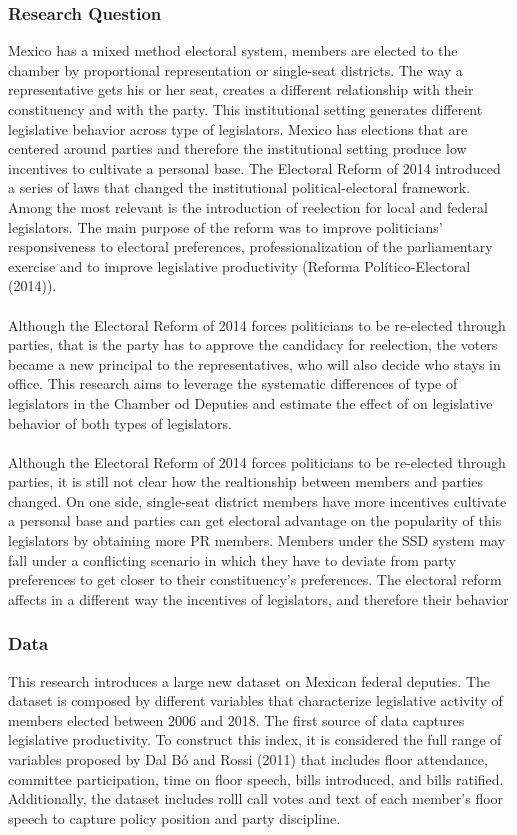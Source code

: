 \documentclass{article}
\begin{document}
\subsubsection*{Research Question}
 Mexico has a mixed method electoral system, members are elected to the chamber by proportional representation or single-seat districts. The way a representative gets his or her seat, creates a different relationship with their constituency and  with the party. This institutional setting generates different legislative behavior across type of legislators. Mexico has elections that are centered around parties and therefore the institutional setting produce low incentives to cultivate a personal base. The Electoral Reform of 2014 introduced a series of laws that changed the institutional political-electoral framework. Among the most relevant is the introduction of reelection for local and federal legislators. The main purpose of the reform was to improve politicians’ responsiveness to electoral preferences, professionalization of the parliamentary exercise and to improve legislative productivity (Reforma Político-Electoral (2014)).  \\
 \\
 Although the Electoral Reform of 2014 forces politicians to be re-elected through parties, that is the party has to approve the candidacy for reelection, the voters became a new principal to the representatives, who will also decide who stays in office. This research aims to leverage the systematic differences of type of legislators in the Chamber od Deputies and estimate the effect of on legislative behavior of both types of legislators.\\
 \\
  Although the Electoral Reform of 2014 forces politicians to be re-elected through parties, it is still not clear how the realtionship between members and parties changed. On one side, single-seat district members have more incentives cultivate a personal base and parties can get electoral advantage on the popularity of this legislators by obtaining more PR members. Members under the SSD system may fall under a conflicting scenario in which they have to deviate from party preferences to get closer to their constituency's preferences. The electoral reform affects in a different way the incentives of legislators, and therefore their behavior 
 
\subsubsection*{Data}
This research introduces a large new dataset on Mexican federal deputies. The dataset is composed by different variables that characterize legislative activity of members elected between 2006 and 2018. The first source of data captures legislative productivity. To construct this index, it is considered the full range of variables proposed by Dal Bó and Rossi (2011) that includes floor attendance, committee participation, time on floor speech, bills introduced, and bills ratified. Additionally, the dataset includes rolll call votes and text of each member's floor speech to capture policy position and party discipline. 
\end{document}
